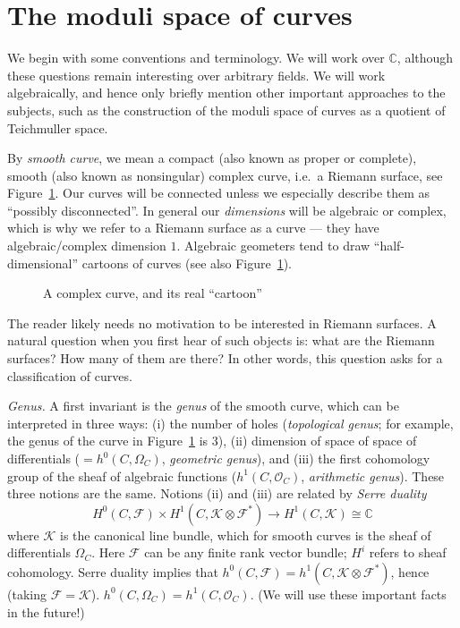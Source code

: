 \documentclass[12pt,letterpaper]{amsart}
\newcommand{\epoint}[1]{\vspace{3mm}\par \noindent \refstepcounter{subsection}{\bf \thesubsection.} 
  {\em #1.} }
\newcommand{\C}{\mathbb{C}}
\newcommand{\cF}{{\mathcal{F}}}
\newcommand{\oh}{{\mathcal{O}}}
\newcommand{\cK}{{\mathcal{K}}}
\newcommand{\lremind}[1]{{\bf[label:  #1]}}
\renewcommand{\lremind}[1]{{}}
\begin{document}
{\section{The moduli space of curves}

We begin with some conventions and terminology.
We will work over $\C$, although these questions
remain interesting over arbitrary fields. 
We will work algebraically, and hence only briefly mention 
other important approaches to the subjects, such as the construction
of the moduli space of curves as a quotient of Teichmuller space.

By {\em smooth curve}, we mean a compact (also known as proper or
complete), smooth (also known as nonsingular) complex curve, i.e.\ a
Riemann surface, see Figure~\ref{curve}.  Our curves will be connected
unless we especially describe them as ``possibly disconnected''.  In
general our {\em dimensions} will be algebraic or complex, which is why
we refer to a Riemann surface as a curve --- they have
algebraic/complex dimension $1$.  Algebraic geometers tend to draw
``half-dimensional'' cartoons of curves (see also Figure~\ref{curve}).

\begin{figure}
\begin{center}

\end{center}
\caption{A complex curve, and its real ``cartoon'' \lremind{curve} }
\label{curve}
\end{figure}


The reader likely needs no motivation to be interested in Riemann
surfaces.  A  natural question when you first hear of such
objects is: what are the Riemann surfaces?  How many of
them are there?  In other words, this question asks for a
classification of curves.

\epoint{Genus} A\label{genus}\lremind{genus} first invariant is the
{\em genus} of the smooth curve, which can be interpreted in three
ways: (i) the number of holes ({\em topological genus}; for example,
the genus of the curve in Figure~\ref{curve} is $3$), (ii) dimension
of space of space of differentials ($=h^0(C, \Omega_C)$, {\em
  geometric genus}), and (iii) the first cohomology group of the sheaf
of algebraic functions ($h^1(C, \oh_C)$, {\em arithmetic genus}).
These three notions are the same.  Notions (ii) and (iii) are related
by {\em Serre duality}\lremind{serreduality}
\begin{equation}\label{serreduality}
\boxed{H^0(C, \cF) \times
  H^1(C, \cK \otimes \cF^*) \rightarrow H^1(C, \cK) \cong \C}
\end{equation} where
$\cK$ is the canonical line bundle, which for smooth curves is the
sheaf of differentials $\Omega_C$.  Here $\cF$ can be any finite rank
vector bundle; $H^i$ refers to sheaf cohomology.  Serre duality
implies that $h^0(C, \cF) = h^1(C, \cK \otimes \cF^*)$, hence (taking
$\cF = \cK$).  $h^0(C, \Omega_C) = h^1(C, \oh_C)$.  (We will use these
important facts in the future!)

}
\end{document}
